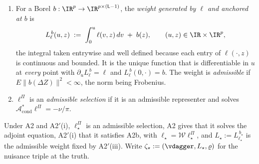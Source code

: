 \begin{definition}
\begin{enumerate}
\item[(b)] For a Borel $b:\IR^{p}\to\IR^{p\times(\mathsf L-1)}$, the \emph{weight generated by $\ell$ and
anchored at $b$} is
\begin{equation}\label{eq:weightdef}
L^{\,b}_{\ell}(u,z)\;:=\;\int_{0}^{u}\ell(v,z)\,dv\;+\;b(z),
\qquad (u,z)\in\IR\times\IR^{p},
\end{equation}
the integral taken entrywise and well defined because each entry of $\ell(\cdot,z)$ is continuous and
bounded. It is the unique
function that is differentiable in $u$ at \emph{every} point with $\partial_uL^{\,b}_\ell=\ell$ and
$L^{\,b}_{\ell}(0,\cdot)=b$. The weight is \emph{admissible} if $E\|b(\Delta Z)\|^{2}<\infty$, the norm
being Frobenius.
\item[(c)] $\ell^\Pi$ is an \emph{admissible selection} if it is an admissible representer and solves
$\mathcal A^\ast_{\mathrm{cond}}\ell^\Pi=-\nu/\pi$.
\end{enumerate}
Under A2 and A2$'$(i), $\ell^\Pi_\star$ is an admissible selection, A2 gives that it solves the
adjoint equation, A2$'$(i) that it satisfies A2b, with $\ell_\star=\mathcal W\ell^\Pi_\star$, and
$L_\star:=L^{\,b_\star}_{\ell_\star}$ is the admissible weight fixed by A2$'$(iii). Write
$\zeta_\star:=(\vdagger,L_\star,\varrho)$ for the nuisance triple at the truth.
\end{definition}

